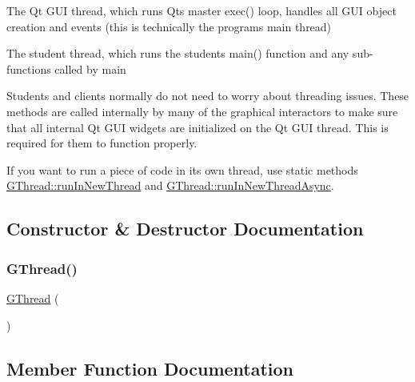 \begin{DoxyEnumerate}
\item The Qt G\+UI thread, which runs Qt\textquotesingle{}s master exec() loop, handles all G\+UI object creation and events (this is technically the program\textquotesingle{}s main thread)


\item The student thread, which runs the student\textquotesingle{}s main() function and any sub-\/functions called by main

Students and clients normally do not need to worry about threading issues. These methods are called internally by many of the graphical interactors to make sure that all internal Qt G\+UI widgets are initialized on the Qt G\+UI thread. This is required for them to function properly.

If you want to run a piece of code in its own thread, use static methods {\ttfamily \mbox{\hyperlink{classGThread_ac9475674a195d39d457307b3e7365ddd}{G\+Thread\+::run\+In\+New\+Thread}}} and {\ttfamily \mbox{\hyperlink{classGThread_ad40c76521d01473a3eea90c01000d9e2}{G\+Thread\+::run\+In\+New\+Thread\+Async}}}. 
\end{DoxyEnumerate}

\subsection{Constructor \& Destructor Documentation}
\mbox{\label{classGThread_a7db4904140090c18f864e09283f2b529}} 
\subsubsection{\texorpdfstring{G\+Thread()}{GThread()}}
{\footnotesize\ttfamily \mbox{\hyperlink{classGThread}{G\+Thread}} (\begin{DoxyParamCaption}{ }\end{DoxyParamCaption})\hspace{0.3cm}{\ttfamily [protected]}}



\subsection{Member Function Documentation}
\mbox{\label{classGThread_a27a1f5f9657637e4a4b6a7127ca9da33}} 
